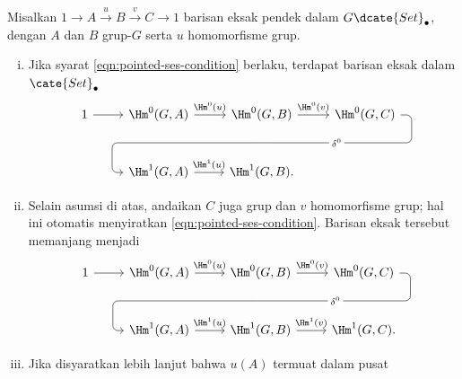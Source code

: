 \begin{teorema}\label{prop:nonabelian-long}
	Misalkan $1\to A\xrightarrow{u}B\xrightarrow{v}C\to1$ barisan eksak
	pendek dalam $G\dcate{Set}_\bullet$, dengan $A$ dan $B$ grup-$G$ serta
	$u$ homomorfisme grup.
	\begin{enumerate}[(i)]
		\item Jika syarat \eqref{eqn:pointed-ses-condition} berlaku, terdapat
		barisan eksak dalam $\cate{Set}_\bullet$
		\begin{equation*}\begin{tikzcd}[row sep=large]
			1 \arrow[r] & \Hm^0(G, A) \arrow[r, "{\Hm^0(u)}"] & \Hm^0(G, B) \arrow[r, "{\Hm^0(v)}"] \arrow[phantom, d, ""{coordinate, name=A}] & \Hm^0(G, C) \arrow[dll, rounded corners, "{\delta^0}" description, to path={
				-- ([xshift=2ex]\tikztostart.east)
				|- (A) [near end]\tikztonodes
				-| ([xshift=-2ex]\tikztotarget.west)
				-- (\tikztotarget)}] \\
			& \Hm^1(G, A) \arrow[r, "{\Hm^1(u)}"] & \Hm^1(G, B). &
		\end{tikzcd}\end{equation*}
		\item Selain asumsi di atas, andaikan $C$ juga grup dan $v$
		homomorfisme grup; hal ini otomatis menyiratkan
		\eqref{eqn:pointed-ses-condition}. Barisan eksak tersebut memanjang
		menjadi
		\begin{equation*}\begin{tikzcd}[row sep=large]
			1 \arrow[r] & \Hm^0(G, A) \arrow[r, "{\Hm^0(u)}"] & \Hm^0(G, B) \arrow[r, "{\Hm^0(v)}"] \arrow[phantom, d, ""{coordinate, name=A}] & \Hm^0(G, C) \arrow[dll, rounded corners, "{\delta^0}" description, to path={
				-- ([xshift=2ex]\tikztostart.east)
				|- (A) [near end]\tikztonodes
				-| ([xshift=-2ex]\tikztotarget.west)
				-- (\tikztotarget)}] \\
			& \Hm^1(G, A) \arrow[r, "{\Hm^1(u)}"] & \Hm^1(G, B) \arrow[r, "{\Hm^1(v)}"] & \Hm^1(G, C).
		\end{tikzcd}\end{equation*}
		\item Jika disyaratkan lebih lanjut bahwa $u(A)$ termuat dalam pusat

\end{enumerate}
\end{teorema}
